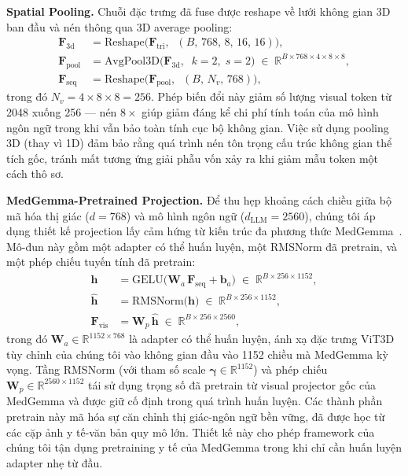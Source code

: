 \textbf{Spatial Pooling.} Chuỗi đặc trưng đã fuse được reshape về lưới không gian 3D ban đầu và nén thông qua 3D average pooling:
\begin{align}
\mathbf{F}_{\text{3d}} &= \text{Reshape}\!\big(\mathbf{F}_{\text{tri}},\;\; (B,\, 768,\, 8,\, 16,\, 16)\big), \label{eq:reshape3d} \\[4pt]
\mathbf{F}_{\text{pool}} &= \text{AvgPool3D}\!\big(\mathbf{F}_{\text{3d}},\;\; k\!=\!2,\; s\!=\!2\big) \;\in\; \mathbb{R}^{B \times 768 \times 4 \times 8 \times 8}, \label{eq:avgpool} \\[4pt]
\mathbf{F}_{\text{seq}} &= \text{Reshape}\!\big(\mathbf{F}_{\text{pool}},\;\; (B,\, N_v,\, 768)\big), \label{eq:reshape_seq}
\end{align}
trong đó $N_v = 4 \times 8 \times 8 = 256$. Phép biến đổi này giảm số lượng visual token từ 2048 xuống 256 --- nén $8\times$ giúp giảm đáng kể chi phí tính toán của mô hình ngôn ngữ trong khi vẫn bảo toàn tính cục bộ không gian. Việc sử dụng pooling 3D (thay vì 1D) đảm bảo rằng quá trình nén tôn trọng cấu trúc không gian thể tích gốc, tránh mất tương ứng giải phẫu vốn xảy ra khi giảm mẫu token một cách thô sơ.

\textbf{MedGemma-Pretrained Projection.} Để thu hẹp khoảng cách chiều giữa bộ mã hóa thị giác ($d = 768$) và mô hình ngôn ngữ ($d_{\text{LLM}} = 2560$), chúng tôi áp dụng thiết kế projection lấy cảm hứng từ kiến trúc đa phương thức MedGemma~\cite{medgemma}. Mô-đun này gồm một adapter có thể huấn luyện, một RMSNorm đã pretrain, và một phép chiếu tuyến tính đã pretrain:
\begin{align}
\mathbf{h}  &= \text{GELU}\!\big(\mathbf{W}_a \, \mathbf{F}_{\text{seq}} + \mathbf{b}_a\big) \;\in\; \mathbb{R}^{B \times 256 \times 1152}, \label{eq:adapter} \\[4pt]
\hat{\mathbf{h}} &= \text{RMSNorm}\!\big(\mathbf{h}\big) \;\in\; \mathbb{R}^{B \times 256 \times 1152}, \label{eq:rmsnorm} \\[4pt]
\mathbf{F}_{\text{vis}} &= \mathbf{W}_p \, \hat{\mathbf{h}} \;\in\; \mathbb{R}^{B \times 256 \times 2560}, \label{eq:projection}
\end{align}
trong đó $\mathbf{W}_a \in \mathbb{R}^{1152 \times 768}$ là adapter có thể huấn luyện, ánh xạ đặc trưng ViT3D tùy chỉnh của chúng tôi vào không gian đầu vào 1152 chiều mà MedGemma kỳ vọng. Tầng RMSNorm (với tham số scale $\boldsymbol{\gamma} \in \mathbb{R}^{1152}$) và phép chiếu $\mathbf{W}_p \in \mathbb{R}^{2560 \times 1152}$ tái sử dụng trọng số đã pretrain từ visual projector gốc của MedGemma và được giữ cố định trong quá trình huấn luyện. Các thành phần pretrain này mã hóa sự căn chỉnh thị giác-ngôn ngữ bền vững, đã được học từ các cặp ảnh y tế-văn bản quy mô lớn. Thiết kế này cho phép framework của chúng tôi tận dụng pretraining y tế của MedGemma trong khi chỉ cần huấn luyện adapter nhẹ từ đầu.


